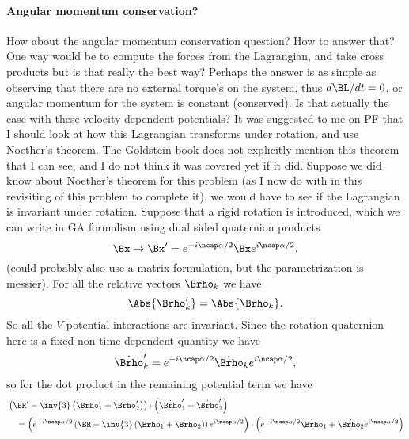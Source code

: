 {\paragraph{Angular momentum conservation?}
%
How about the angular momentum conservation question?  How to answer that?  One way would be to compute the forces from the Lagrangian, and take cross products but is that really the best way?  Perhaps the answer is as simple as observing that there are no external torque's on the system, thus \(d\BL/dt = 0\), or angular momentum for the system is constant (conserved).  Is that actually the case
with these velocity dependent potentials?
%
It was suggested to me on PF that I should look at how this Lagrangian transforms under rotation, and use Noether's theorem.
The Goldstein book does not explicitly mention this theorem that I can see, and I do not think it was covered yet if it did.
%
Suppose we did know about Noether's theorem for this problem (as I now do with
in this revisiting of this problem to complete it), we would have to
see if the Lagrangian is invariant under rotation.  Suppose that a rigid rotation is introduced, which we can write in GA
formalism using dual sided quaternion products
%
\begin{equation}\label{eqn:goldsteinCh12:200}
\Bx \rightarrow \Bx' = e^{-i\ncap \alpha/2} \Bx e^{i\ncap\alpha/2}.
\end{equation}
%
(could probably also use a matrix formulation, but the parametrization is messier).
%
For all the relative vectors \(\Brho_k\) we have
\begin{equation}\label{eqn:goldsteinCh12:220}
\Abs{\Brho_k'} = \Abs{\Brho_k}.
\end{equation}
So all the \(V\) potential interactions are invariant.
%
Since the rotation quaternion here is a fixed non-time dependent quantity we have
\begin{equation}\label{eqn:goldsteinCh12:240}
\dot{\Brho}_k' = e^{-i\ncap \alpha/2} \dot{\Brho}_k e^{i\ncap\alpha/2},
\end{equation}
so for the dot product in the remaining potential term we have
\begin{equation}\label{eqn:goldsteinCh12:260}
\begin{aligned}
&\left( \BR' - \inv{3}\left(\Brho_1' + \Brho_2'\right) \right) \cdot \left({\dot{\Brho}}_1' + {\dot{\Brho}}_2'\right) \\
&\quad=
\left(e^{-i\ncap \alpha/2} \left( \BR - \inv{3}\left(\Brho_1 + \Brho_2\right) \right) e^{i\ncap\alpha/2}\right) \cdot
\left(e^{-i\ncap \alpha/2} \dot{\Brho}_1 + \dot{\Brho_2} e^{i\ncap\alpha/2}\right) \\

\end{aligned}
\end{equation}}
